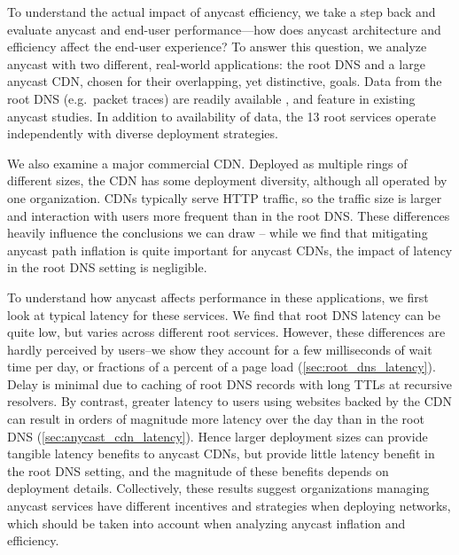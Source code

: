 \documentclass[sigconf,letterpaper,nonacm,10pt,anonymous]{acmart}
\begin{document}
To understand the actual impact of anycast efficiency, we take a step
back and evaluate anycast and end-user performance---how does anycast
architecture and efficiency affect the end-user experience? To answer
this question, we analyze anycast with two different, real-world
applications: the root DNS and a large anycast CDN, chosen for their
overlapping, yet distinctive, goals. Data from the root DNS (e.g.~packet
traces) are readily available \cite{root_servers}, and feature in
existing anycast
studies\cite{colitti2006evaluating, moura2016anycast, de2017anycast, li_levin_spring_bhattacharjee_2018, mcquistin2019taming}.
In addition to availability of data, the 13 root services operate
independently with diverse deployment strategies.

We also examine a major commercial CDN. Deployed as multiple rings of
different sizes, the CDN has some deployment diversity, although all
operated by one organization. CDNs typically serve HTTP traffic, so the
traffic size is larger and interaction with users more frequent than in
the root DNS. These differences heavily influence the conclusions we can
draw -- while we find that mitigating anycast path inflation is quite
important for anycast CDNs, the impact of latency in the root DNS
setting is negligible.

To understand how anycast affects performance in these applications, we
first look at typical latency for these services. We find that root DNS
latency can be quite low, but varies across different root services.
However, these differences are hardly perceived by users--we show they
account for a few milliseconds of wait time per day, or fractions of a
percent of a page load (\cref{sec:root_dns_latency}). Delay is minimal
due to caching of root DNS records with long TTLs at recursive
resolvers. By contrast, greater latency to users using websites backed
by the CDN can result in orders of magnitude more latency over the day
than in the root DNS (\cref{sec:anycast_cdn_latency}). Hence larger
deployment sizes can provide tangible latency benefits to anycast CDNs,
but provide little latency benefit in the root DNS setting, and the
magnitude of these benefits depends on deployment details. Collectively,
these results suggest organizations managing anycast services have
different incentives and strategies when deploying networks, which
should be taken into account when analyzing anycast inflation and
efficiency.
\end{document}
